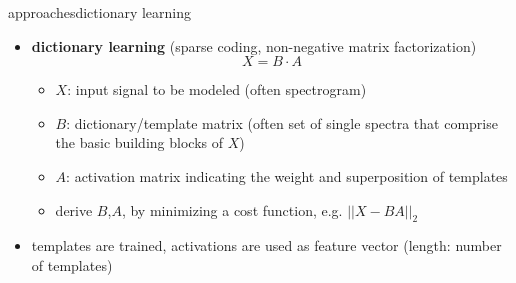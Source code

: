         \begin{frame}{approaches}{dictionary learning}
            \begin{itemize}
                \item   \textbf{dictionary learning} (sparse coding, non-negative matrix factorization)
                    \begin{equation*}
                        X = B\cdot A
                    \end{equation*}
                    \begin{itemize}
                        \item[]   $X$: input signal to be modeled (often spectrogram)
                        \item[]   $B$: dictionary/template matrix (often set of single spectra that comprise the basic building blocks of $X$)
                        \item[]   $A$: activation matrix indicating the weight and superposition of templates 
                    \end{itemize}
                    \begin{itemize}
                        \item   derive $B$,$A$, by minimizing a cost function, e.g. $||X-BA||_2$
                    \end{itemize}
                \item<2->[$\rightarrow$] templates are trained, activations are used as feature vector (length: number of templates)
            \end{itemize}
		\end{frame}
